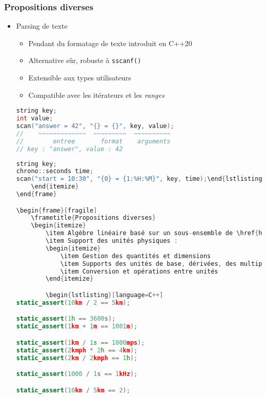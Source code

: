 \documentclass[C++.tex]{subfiles}
\begin{document}
\begin{frame}[fragile]
	\frametitle{Propositions diverses}
	\begin{itemize}
		\item Parsing de texte
			\begin{itemize}
				\item Pendant du formatage de texte introduit en C++20
				\item Alternative sûr, robuste à \lstinline|sscanf()|
				\item Extensible aux types utilisateurs
				\item Compatible avec les itérateurs et les \textit{ranges}
			\end{itemize}

			\begin{lstlisting}[language=C++]
string key;
int value;
scan("answer = 42", "{} = {}", key, value);
//    ~~~~~~~~~~~~~  ~~~~~~~~~  ~~~~~~~~~~
//        entree       format    arguments
// key : "answer", value : 42\end{lstlisting}

			\begin{lstlisting}[language=C++]
string key;
chrono::seconds time;
scan("start = 10:30", "{0} = {1:%H:%M}", key, time);\end{lstlisting}
	\end{itemize}
\end{frame}

\begin{frame}[fragile]
	\frametitle{Propositions diverses}
	\begin{itemize}
		\item Algèbre linéaire basé sur un sous-ensemble de \href{https://www.netlib.org/blas/}{BLAS} (vecteur, matrice, \ldots)
		\item Support des unités physiques :
		\begin{itemize}
			\item Gestion des quantités et dimensions
			\item Supports des unités de base, dérivées, des multiples et des sous-multiples
			\item Conversion et opérations entre unités
		\end{itemize}

		\begin{lstlisting}[language=C++]
static_assert(10km / 2 == 5km);

static_assert(1h == 3600s);
static_assert(1km + 1m == 1001m);

static_assert(1km / 1s == 1000mps);
static_assert(2kmph * 2h == 4km);
static_assert(2km / 2kmph == 1h);

static_assert(1000 / 1s == 1kHz);

static_assert(10km / 5km == 2);\end{lstlisting}
	\end{itemize}
\end{frame}
\end{document}
